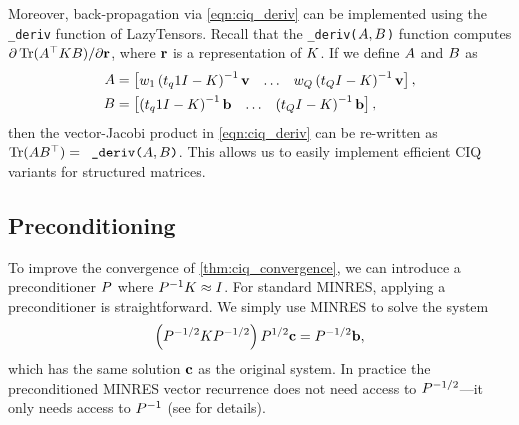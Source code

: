 Moreover, back-propagation via \cref{eqn:ciq_deriv} can be implemented using the {\tt \_deriv} function of LazyTensors.
Recall that the {\tt \_deriv($ A, B $)} function computes $\partial \tr{ \bA^\top \bK \bB }/{\partial \br}$, where $\mathbf{r}$ is a representation of $K$.
If we define $A$ and $B$ as
%
\begin{align*}
  A &= \begin{bmatrix}
    w_1 \left( t_q1I - K \right)^{-1} \mathbf{v}
    & \ldots &
    w_Q \left( t_Q I - K \right)^{-1} \mathbf{v}
  \end{bmatrix},
  \\
  B &= \begin{bmatrix}
    \left( t_q1I - K \right)^{-1} \mathbf{b}
    & \ldots &
    \left( t_Q I - K \right)^{-1} \mathbf{b}
  \end{bmatrix},
\end{align*}
%
then the vector-Jacobi product in \cref{eqn:ciq_deriv} can be re-written as $\tr{ \bA \bB^\top } = \texttt{ \_deriv($\bA, \bB$)}$.
This allows us to easily implement efficient CIQ variants for structured matrices.


\subsection{Preconditioning}
\label{sec:ciq_precond}

To improve the convergence of \cref{thm:ciq_convergence}, we can introduce a preconditioner $P$ where $P^{-1} K \approx I$.
For standard MINRES, applying a preconditioner is straightforward.
We simply use MINRES to solve the system
\[
  \left( P^{-1/2} K P^{-1/2} \right) P^{1/2} \mathbf{c} = P^{-1/2} \mathbf{b},
\]
which has the same solution $\mathbf{c}$ as the original system.
In practice the preconditioned MINRES vector recurrence does not need access to $P^{-1/2}$---it only needs access to $P^{-1}$
(see \citep[][Ch. 3.4]{choi2006iterative} for details).

